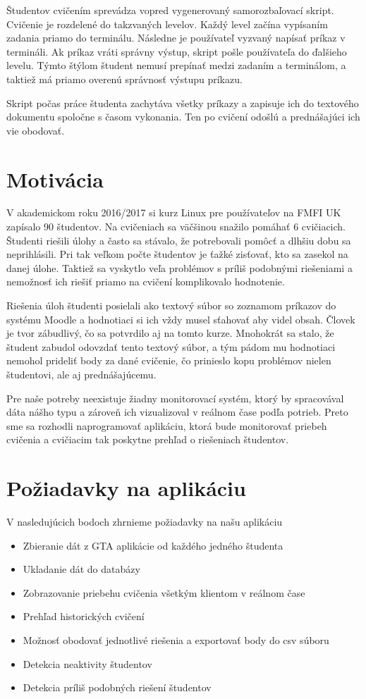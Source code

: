 Študentov cvičením sprevádza vopred vygenerovaný samorozbaľovací skript. Cvičenie
je rozdelené do takzvaných levelov. Každý level začína vypísaním zadania priamo do
terminálu. Následne je používateľ vyzvaný napísať príkaz v termináli. Ak príkaz
vráti správny výstup, skript pošle používateľa do ďalšieho levelu. Týmto štýlom
študent nemusí prepínať medzi zadaním a terminálom, a taktiež má priamo overenú
správnosť výstupu príkazu.

Skript počas práce študenta zachytáva všetky príkazy a zapisuje ich do textového
dokumentu spoločne s časom vykonania. Ten po cvičení odošlú a prednášajúci ich vie
obodovať.

\section{Motivácia}
\label{sec:motivacia}

V akademickom roku 2016/2017 si kurz Linux pre používateľov na FMFI UK zapísalo
90 študentov. Na cvičeniach sa väčšinou snažilo pomáhať 6 cvičiacich. Študenti riešili
úlohy a často sa stávalo, že potrebovali pomôcť a dlhšiu dobu sa neprihlásili.
Pri tak veľkom počte študentov je ťažké zisťovať, kto sa zasekol na danej úlohe.
Taktiež sa vyskytlo veľa problémov s príliš podobnými riešeniami a nemožnosť ich 
riešiť priamo na cvičení komplikovalo hodnotenie.

Riešenia úloh študenti posielali ako textový súbor so zoznamom príkazov do systému
Moodle a hodnotiaci si ich vždy musel sťahovať aby videl obsah. Človek je
tvor zábudlivý, čo sa potvrdilo aj na tomto kurze. Mnohokrát sa stalo, že študent
zabudol odovzdať tento textový súbor, a tým pádom mu hodnotiaci nemohol prideliť
body za dané cvičenie, čo prinieslo kopu problémov nielen študentovi, ale aj
prednášajúcemu.

Pre naše potreby neexistuje žiadny monitorovací systém, ktorý by spracovával
dáta nášho typu a zároveň ich vizualizoval v reálnom čase podľa potrieb. 
Preto sme sa rozhodli naprogramovať aplikáciu, ktorá bude
monitorovať priebeh cvičenia a cvičiacim tak poskytne prehľad o riešeniach študentov.

\section{Požiadavky na aplikáciu}
\label{sec:apprequirements}

V nasledujúcich bodoch zhrnieme požiadavky na našu aplikáciu

\begin{itemize}
	\item Zbieranie dát z GTA aplikácie od každého jedného študenta
	\item Ukladanie dát do databázy
	\item Zobrazovanie priebehu cvičenia všetkým klientom v reálnom čase
	\item Prehľad historických cvičení
	\item Možnosť obodovať jednotlivé riešenia a exportovať body do csv súboru
	\item Detekcia neaktivity študentov
	\item Detekcia príliš podobných riešení študentov
\end{itemize}


